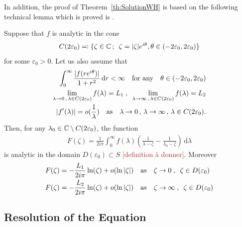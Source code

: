 \documentclass[11pt]{amsart}
\newcommand{\diff}{\,\mathrm{d}}
\newcommand{\ndr}[1]{\textcolor{brown}{[#1]}}
\begin{document}
In addition, the proof of Theorem~\ref{th:SolutionWH} is based on the following technical lemma which is proved is \cite{escobedo2007fundamental}.  
\begin{lemma}
    \label{escoARMA:C.2.}
    Suppose that $f$ is analytic in the cone 
    $$ C(2\varepsilon_0) \eqqcolon \{ \zeta \in \mathbb{C} \,;\,\ \zeta = |\zeta|e^{i\theta}, \theta \in (-2\varepsilon_0, 2\varepsilon_0)\}$$
    for some $\varepsilon_0 > 0$. Let us also assume that 
    \begin{align}
        \label{escoARMA:C5} \int_0^\infty \frac{|f(re^{i \theta})|}{1+r^2} \diff r < \infty \mtext{for any} \theta \in (-2\varepsilon_0, 2\varepsilon_0) \\
        \label{escoARMA:C6} \lim_{\lambda \to 0 \,,\, \lambda \in C(2\varepsilon_0)} f(\lambda) = L_1 
        \eqsepv \lim_{\lambda \to \infty \,,\, \lambda \in C(2\varepsilon_0)} f(\lambda) = L_2 \\
        \label{escoARMA:C7} |f'(\lambda)| = o(\frac1\lambda) \mtext{as} \lambda \to 0 \,,\,\lambda \to \infty \,,\, \lambda \in C(2\varepsilon_0). 
    \end{align}
    Then, for any $\lambda_0 \in \mathbb{C} \setminus C(2\varepsilon_0)$, the function
    \begin{align}
        \label{escoARMA:C8} F(\zeta) = \frac{1}{2i\pi} \int_0^\infty f(\lambda) \left( \frac{1}{\lambda - \zeta} - \frac{1}{\lambda_0 - \zeta}\right) \diff \lambda
    \end{align} 
    is analytic in the domain $D(\varepsilon_0) \subset S$ \ndr{definition à donner}. Moreover
    \begin{align}
        F(\zeta) &= - \frac{L_1}{2i\pi} \ln(\zeta) + o(\ln |\zeta|) \quad \text{as} \quad \zeta \to 0 \; , \enspace \zeta \in D(\varepsilon_0) \\
        F(\zeta) &= - \frac{L_2}{2i\pi} \ln(\zeta) + o(\ln |\zeta|) \quad \text{as} \quad \zeta \to \infty \; , \enspace \zeta \in D(\varepsilon_0)
    \end{align} 
\end{lemma}

\subsection{Resolution of the Equation}
\end{document}
